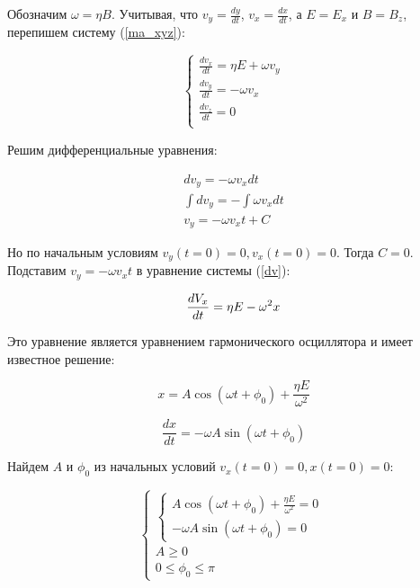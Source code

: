 Обозначим $\omega=\eta{B}$. Учитывая, что $v_y=\frac{dy}{dt}$, $v_x=\frac{dx}{dt}$,  а $E=E_x$ и $B=B_z$, перепишем систему (\ref{ma_xyz}):

\begin{equation}
\label{dv}
 \begin{cases}
   \frac{dv_x}{dt}=\eta{}E+\omega{}v_y\\
   \frac{dv_y}{dt}=-\omega{}v_x\\
   \frac{dv_z}{dt}=0\\
 \end{cases}
\end{equation}

Решим дифференциальные уравнения:

\begin{gather}
	\label{diff}
	 dv_y=-\omega{}v_x{}dt\\
	 \int dv_y=-\int\omega{}v_x{}dt\\
	 v_y=-\omega{}v_x{}t+C
\end{gather}

Но по начальным условиям $v_y(t=0)=0,v_x(t=0)=0$. Тогда $C=0$. Подставим $v_y=-\omega{}v_x{}t$ в уравнение системы (\ref{dv}):

\begin{equation}
	\frac{dV_x}{dt}=\eta{}E-\omega^2{}x\\
\end{equation}

Это уравнение является уравнением гармонического осциллятора и имеет известное решение:

\begin{equation}
	x=A\cos{(\omega{t}+\phi_0)}+\frac{\eta{E}}{\omega^2}
\end{equation}

\begin{equation}
	\frac{dx}{dt}=-\omega{A}\sin{(\omega{t}+\phi_0)}
\end{equation}

Найдем $A$ и $\phi_0$ из начальных условий $v_x(t=0)=0, x(t=0)=0$:

\begin{equation}
\label{Aphi}
 \begin{cases}
    \begin{cases}
   		A\cos{(\omega{t}+\phi_0)}+\frac{\eta{E}}{\omega^2}=0\\
   		-\omega{A}\sin{(\omega{t}+\phi_0)}=0
 	\end{cases}\\
 	A\geq0\\
 	0\leq\phi_0\leq\pi
 \end{cases}
\end{equation}

